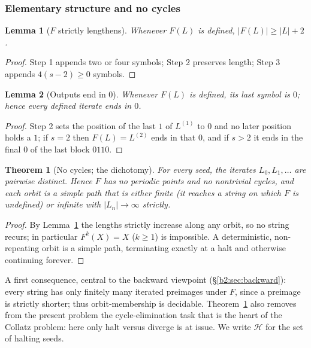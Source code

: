 \documentclass[a4paper]{article}
\theoremstyle{plain}
\newtheorem{thm}[theorem]{Theorem}
\newtheorem{lemma}{Lemma}[subsection]
\theoremstyle{definition}
\theoremstyle{remark}
\begin{document}
\subsubsection{Elementary structure and no cycles}\label{b2:sec:elem}
\begin{lemma}[$F$ strictly lengthens]\label{b2:lem:length}
Whenever $F(L)$ is defined, $|F(L)|\ge|L|+2$.
\end{lemma}
\begin{proof}
Step 1 appends two or four symbols; Step 2 preserves length; Step 3 appends $4(s-2)\ge 0$ symbols.
\end{proof}

\begin{lemma}[Outputs end in $0$]\label{b2:lem:end0}
Whenever $F(L)$ is defined, its last symbol is $0$; hence every defined iterate ends in $0$.
\end{lemma}
\begin{proof}
Step 2 sets the position of the last $1$ of $L^{(1)}$ to $0$ and no later position holds a $1$; if $s=2$ then $F(L)=L^{(2)}$ ends in that $0$, and if $s>2$ it ends in the final $0$ of the last block $0110$.
\end{proof}

\begin{thm}[No cycles; the dichotomy]\label{b2:thm:nocycles}
For every seed, the iterates $L_0,L_1,\dots$ are pairwise distinct. Hence $F$ has no periodic points and no nontrivial cycles, and each orbit is a simple path that is either finite (it reaches a string on which $F$ is undefined) or infinite with $|L_n|\to\infty$ strictly.
\end{thm}
\begin{proof}
By Lemma~\ref{b2:lem:length} the lengths strictly increase along any orbit, so no string recurs; in particular $F^k(X)=X$ ($k\ge 1$) is impossible. A deterministic, non-repeating orbit is a simple path, terminating exactly at a halt and otherwise continuing forever.
\end{proof}

A first consequence, central to the backward viewpoint (\S\ref{b2:sec:backward}): every string has only finitely many iterated preimages under $F$, since a preimage is strictly shorter; thus orbit-membership is decidable. Theorem~\ref{b2:thm:nocycles} also removes from the present problem the cycle-elimination task that is the heart of the Collatz problem: here only halt versus diverge is at issue. We write $\mathcal H$ for the set of halting seeds.
\end{document}

